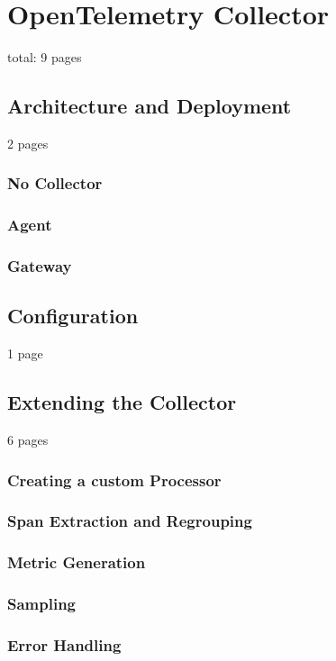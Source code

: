 \chapter{OpenTelemetry Collector}
\label{chap:collector}

total: 9 pages

\section{Architecture and Deployment}
\label{sec:c_architecture_and_deployment}

2 pages

\subsection{No Collector}
\subsection{Agent}
\subsection{Gateway}

\section{Configuration}
\label{sec:c_configuration}

1 page

\section{Extending the Collector}
\label{sec:c_extending_the_collector}

6 pages

\subsection{Creating a custom Processor}
\subsection{Span Extraction and Regrouping}
\subsection{Metric Generation}
\subsection{Sampling}
\subsection{Error Handling}